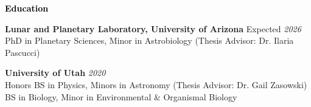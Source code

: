 \documentclass{resume} %
\newcommand{\mystrut}{\rule[-.3\baselineskip]{0pt}{\baselineskip}}
\renewenvironment{rSection}[1]{\mystrut{\textcolor{black}{{\large{\textbf{#1}}}}}
\vspace{-5pt} %
\begin{list}{}{
\setlength{\leftmargin}{0em}
}
\item[]
}{
\end{list}
}
\begin{document}
\thispagestyle{empty}


\vspace{5pt}\hline
\vspace{0pt}

\begin{rSection}{Education}

{\bf Lunar and Planetary Laboratory, University of Arizona} \hfill {Expected \em 2026} 
\\ PhD in Planetary Sciences, Minor in Astrobiology (Thesis Advisor: Dr. Ilaria Pascucci) \hfill \vspace{-5pt}

{\bf University of Utah} \hfill {\em 2020} 
\\ Honors BS in Physics, Minors in Astronomy (Thesis Advisor: Dr. Gail Zasowski) \hfill
\\ BS in Biology, Minor in Environmental \& Organismal Biology \hfill
\end{rSection}
\vspace{5pt}\hline
\vspace{0pt}



\end{document}
